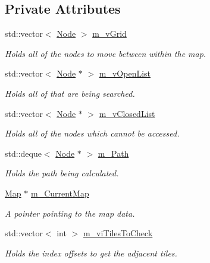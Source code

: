 \subsection*{Private Attributes}
\begin{DoxyCompactItemize}
\item 
std\+::vector$<$ \hyperlink{struct_node}{Node} $>$ \hyperlink{class_a_star_a8597b13604069f52b8b29961332fa8bc}{m\+\_\+v\+Grid}
\begin{DoxyCompactList}\small\item\em Holds all of the nodes to move between within the map. \end{DoxyCompactList}\item 
std\+::vector$<$ \hyperlink{struct_node}{Node} $\ast$ $>$ \hyperlink{class_a_star_ac8f9eb403a0559882f1e199061d2d6c1}{m\+\_\+v\+Open\+List}
\begin{DoxyCompactList}\small\item\em Holds all of that are being searched. \end{DoxyCompactList}\item 
std\+::vector$<$ \hyperlink{struct_node}{Node} $\ast$ $>$ \hyperlink{class_a_star_af08da815977f33f6ba9f5b95f9ef052c}{m\+\_\+v\+Closed\+List}
\begin{DoxyCompactList}\small\item\em Holds all of the nodes which cannot be accessed. \end{DoxyCompactList}\item 
std\+::deque$<$ \hyperlink{struct_node}{Node} $\ast$ $>$ \hyperlink{class_a_star_adca58c26b853ae0c31568ba72233d00d}{m\+\_\+\+Path}
\begin{DoxyCompactList}\small\item\em Holds the path being calculated. \end{DoxyCompactList}\item 
\hyperlink{class_map}{Map} $\ast$ \hyperlink{class_a_star_ac97bc1a05e13febf9c8e3cd1a76a42b2}{m\+\_\+\+Current\+Map}
\begin{DoxyCompactList}\small\item\em A pointer pointing to the map data. \end{DoxyCompactList}\item 
std\+::vector$<$ int $>$ \hyperlink{class_a_star_af2d53752390a0b942ae3ed49ad068fae}{m\+\_\+vi\+Tiles\+To\+Check}
\begin{DoxyCompactList}\small\item\em Holds the index offsets to get the adjacent tiles. \end{DoxyCompactList}\item 

\end{DoxyCompactItemize}
